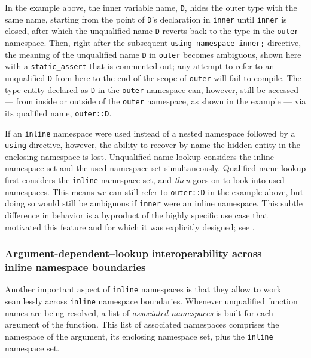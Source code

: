 \noindent In the example above, the inner variable name, \lstinline!D!, hides the
outer type with the same name, starting from the point of \lstinline!D!'s
declaration in \lstinline!inner! until \lstinline!inner! is closed, after
which the unqualified name \lstinline!D! reverts back to the type in the
\lstinline!outer! namespace. Then, right after the subsequent
\lstinline!using!~\lstinline!namespace!~\lstinline!inner;! directive, the meaning
of the unqualified name \lstinline!D! in \lstinline!outer! becomes ambiguous,
shown here with a \lstinline!static_assert! that is commented out; any
attempt to refer to an unqualified \lstinline!D! from here to the end of
the scope of \lstinline!outer! will fail to compile. The type entity
declared as \lstinline!D! in the \lstinline!outer! namespace can, however,
still be accessed --- from inside or outside of the \lstinline!outer!
namespace, as shown in the example --- via its qualified name,
\lstinline!outer::D!.

If an \lstinline!inline! namespace were used instead of a nested namespace
followed by a \mbox{\lstinline!using!} directive, however, the ability to recover
by name the hidden entity in the enclosing namespace is lost.
Unqualified name lookup considers the inline namespace set and the used
namespace set simultaneously. Qualified name lookup first considers the
\lstinline!inline! namespace set, and \emph{then} goes on to look into used
namespaces. This means we can still refer to \lstinline!outer::D! in the
example above, but doing so would still be ambiguous if \lstinline!inner!
were an inline namespace. This subtle difference in behavior is a
byproduct of the highly specific use case that motivated this feature
and for which it was explicitly designed; see . 

\subsubsection[Argument-dependent–lookup interoperability across \lstinline!inline! \lstinline!namespace! boundaries]{Argument-dependent–lookup interoperability across\\[0.5ex] {\SubsubsecCode inline} {\SubsubsecCode namespace} boundaries}\label{argument-dependent–lookup-interoperability-across-inline-namespace-boundaries}

Another important aspect of \lstinline!inline! namespaces is that they
allow  to work seamlessly across \lstinline!inline! namespace
boundaries. Whenever unqualified function names are being resolved, a
list of \emph{associated namespaces} is built for each argument of the
function. This list of associated namespaces comprises the namespace of the
argument, its enclosing namespace set, plus the \lstinline!inline!
namespace set.

